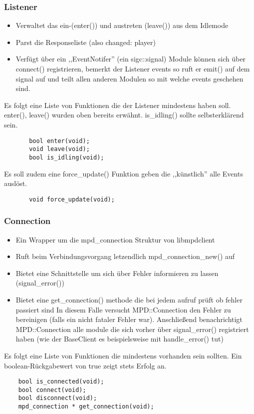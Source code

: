\subsubsection{Listener}
\begin{itemize}
    \item Verwaltet das ein-(enter()) und austreten (leave()) aus dem Idlemode
    \item Parst die Responseliste (also changed: player)
    \item Verfügt über ein ,,EventNotifer'' (ein sigc::signal)
        Module können sich über connect() registrieren,
        bemerkt der Listener events so ruft er emit() auf dem signal auf
        und teilt allen anderen Modulen so mit welche events geschehen sind.
\end{itemize}

Es folgt eine Liste von Funktionen die der Listener mindestens haben soll.
\\
enter(), leave() wurden oben bereits erwähnt. 
is\_idling() sollte selbsterklärend sein.
\begin{verbatim}
       bool enter(void);
       void leave(void);
       bool is_idling(void);
\end{verbatim}

Es soll zudem eine force\_update() Funktion geben die ,,künstlich'' alle Events auslöst.
\begin{verbatim}
       void force_update(void);
\end{verbatim}

\subsubsection{Connection}
\begin{itemize}
    \item Ein Wrapper um die mpd\_connection Struktur von libmpdclient
    \item Ruft beim Verbindungsvorgang letzendlich mpd\_connection\_new() auf 
    \item Bietet eine Schnittstelle um sich über Fehler informieren zu lassen (signal\_error())
    \item Bietet eine get\_connection() methode die bei jedem aufruf prüft ob fehler passiert sind
        In diesem Falle versucht MPD::Connection den Fehler zu bereinigen (falls ein nicht fataler Fehler war).
        Anschließend benachrichtigt MPD::Connection alle module die sich vorher über signal\_error() 
        registriert haben (wie der BaseClient es beispielsweise mit handle\_error() tut)
\end{itemize}
Es folgt eine Liste von Funktionen die mindestens vorhanden sein sollten.
Ein boolean-Rückgabewert von true zeigt stets Erfolg an.
\\
\begin{verbatim}
    bool is_connected(void);
    bool connect(void);
    bool disconnect(void);
    mpd_connection * get_connection(void);
\end{verbatim}

